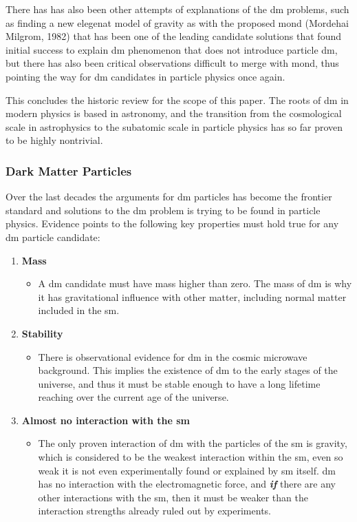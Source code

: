 There has has also been other attempts of explanations of the \gls{dm} problems, such as finding a new elegenat model of gravity as with the proposed \gls{mond} (Mordehai Milgrom, 1982) that has been one of the leading candidate solutions that found initial success to explain \gls{dm} phenomenon that does not introduce particle \gls{dm}, but there has also been critical observations difficult to merge with \gls{mond}, thus pointing the way for \gls{dm} candidates in particle physics once again. 

This concludes the historic review for the scope of this paper. The roots of \gls{dm} in modern physics is based in astronomy, and the transition from the cosmological scale in astrophysics to the subatomic scale in particle physics has so far proven to be highly nontrivial.

\subsubsection{Dark Matter Particles}
\label{sec:dm_particles}

Over the last decades the arguments for \gls{dm} particles has become the frontier standard and solutions to the \gls{dm} problem is trying to be found in particle physics. Evidence points to the following key properties must hold true for any \gls{dm} particle candidate:

\begin{enumerate}
    \item \textbf{Mass}
    \begin{itemize}
        \item A \gls{dm} candidate must have mass higher than zero. The mass of \gls{dm} is why it has gravitational influence with other matter, including normal matter included in the \gls{sm}. 
    \end{itemize}
    \item \textbf{Stability}
    \begin{itemize}
        \item There is observational evidence for \gls{dm} in the cosmic microwave background. This implies the existence of \gls{dm} to the early stages of the universe, and thus it must be stable enough to have a long lifetime reaching over the current age of the universe.
    \end{itemize}
    \item \textbf{Almost no interaction with the \gls{sm}}
    \begin{itemize}
        \item The only proven interaction of \gls{dm} with the particles of the \gls{sm} is gravity, which is considered to be the weakest interaction within the \gls{sm}, even so weak it is not even experimentally found or explained by \gls{sm} itself. \gls{dm} has no interaction with the electromagnetic force, and \textbf{\textit{if}} there are any other interactions with the \gls{sm}, then it must be weaker than the interaction strengths already ruled out by experiments. 
    \end{itemize}
\end{enumerate}

